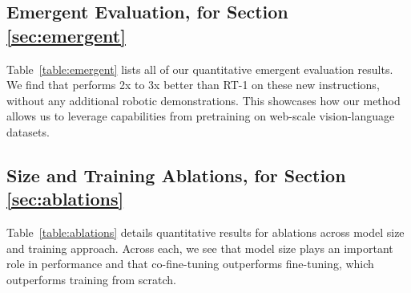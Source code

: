 \subsection{Emergent Evaluation, for Section \ref{sec:emergent}}
\label{sec:app_emergent}
Table~\ref{table:emergent} lists all of our quantitative emergent evaluation results. We find that \methodname performs 2x to 3x better than RT-1 on these new instructions, without any additional robotic demonstrations. This showcases how our method allows us to leverage capabilities from pretraining on web-scale vision-language datasets.

\begin{table}[H]
        \centering
        \vspace{0.5em}
        \caption{Performance of \methodname and baselines on quantitative emergent evaluations.}
        \label{table:emergent}
\end{table}

\subsection{Size and Training Ablations, for Section \ref{sec:ablations}}
\label{sec:app_ablations}
Table~\ref{table:ablations} details quantitative results for ablations across model size and training approach. Across each, we see that model size plays an important role in performance and that co-fine-tuning outperforms fine-tuning, which outperforms training from scratch.


